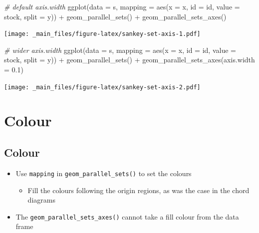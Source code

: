 \documentclass[
]{book}
\newenvironment{Shaded}{\begin{snugshade}}{\end{snugshade}}
\newcommand{\AttributeTok}[1]{\textcolor[rgb]{0.77,0.63,0.00}{#1}}
\newcommand{\CommentTok}[1]{\textcolor[rgb]{0.56,0.35,0.01}{\textit{#1}}}
\newcommand{\FloatTok}[1]{\textcolor[rgb]{0.00,0.00,0.81}{#1}}
\newcommand{\FunctionTok}[1]{\textcolor[rgb]{0.00,0.00,0.00}{#1}}
\newcommand{\NormalTok}[1]{#1}
\newcommand{\SpecialCharTok}[1]{\textcolor[rgb]{0.00,0.00,0.00}{#1}}
\providecommand{\tightlist}{%
  \setlength{\itemsep}{0pt}\setlength{\parskip}{0pt}}
\begin{document}
\begin{Shaded}
\begin{Highlighting}[]
\CommentTok{\# default axis.width}
\FunctionTok{ggplot}\NormalTok{(}\AttributeTok{data =}\NormalTok{ s,}
       \AttributeTok{mapping =} \FunctionTok{aes}\NormalTok{(}\AttributeTok{x =}\NormalTok{ x, }\AttributeTok{id =}\NormalTok{ id, }\AttributeTok{value =}\NormalTok{ stock, }\AttributeTok{split =}\NormalTok{ y)) }\SpecialCharTok{+}
  \FunctionTok{geom\_parallel\_sets}\NormalTok{() }\SpecialCharTok{+}
  \FunctionTok{geom\_parallel\_sets\_axes}\NormalTok{()}
\end{Highlighting}
\end{Shaded}

\texttt{[image: \_main\_files/figure-latex/sankey-set-axis-1.pdf]}

\begin{Shaded}
\begin{Highlighting}[]
\CommentTok{\# wider axis.width}
\FunctionTok{ggplot}\NormalTok{(}\AttributeTok{data =}\NormalTok{ s,}
      \AttributeTok{mapping =} \FunctionTok{aes}\NormalTok{(}\AttributeTok{x =}\NormalTok{ x, }\AttributeTok{id =}\NormalTok{ id, }\AttributeTok{value =}\NormalTok{ stock, }\AttributeTok{split =}\NormalTok{ y)) }\SpecialCharTok{+}
  \FunctionTok{geom\_parallel\_sets}\NormalTok{() }\SpecialCharTok{+}
  \FunctionTok{geom\_parallel\_sets\_axes}\NormalTok{(}\AttributeTok{axis.width =} \FloatTok{0.1}\NormalTok{)}
\end{Highlighting}
\end{Shaded}

\texttt{[image: \_main\_files/figure-latex/sankey-set-axis-2.pdf]}

\hypertarget{colour-1}{%
\section{Colour}\label{colour-1}}

\hypertarget{colour-2}{%
\subsection{Colour}\label{colour-2}}

\begin{itemize}
\tightlist
\item
  Use \texttt{mapping} in \texttt{geom\_parallel\_sets()} to set the colours

  \begin{itemize}
  \tightlist
  \item
    Fill the colours following the origin regions, as was the case in the chord diagrams
  \end{itemize}
\item
  The \texttt{geom\_parallel\_sets\_axes()} cannot take a fill colour from the data frame
\end{itemize}
\end{document}
